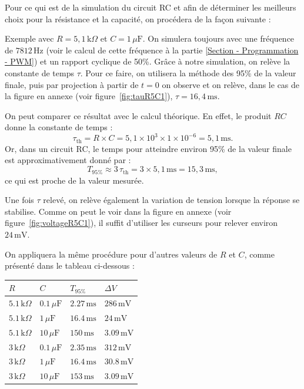 \documentclass[12pt, a4paper, titlepage]{article}
\begin{document}
Pour ce qui est de la simulation du circuit RC et afin de déterminer les meilleurs choix pour la résistance et la capacité, on procédera de la façon suivante :

Exemple avec \(R = 5,1\,\mathrm{k}\Omega\) et \(C = 1\,\mu\mathrm{F}\). On simulera toujours avec une fréquence de \(7812\,\mathrm{Hz}\) (voir le calcul de cette fréquence à la partie \ref{Section - Programmation - PWM}) et un rapport cyclique de 50\%. Grâce à notre simulation, on relève la constante de temps \(\tau\). Pour ce faire, on utilisera la méthode des 95\% de la valeur finale, puis par projection à partir de \(t = 0\) on observe et on relève, dans le cas de la figure en annexe (voir figure~\ref{fig:tauR5C1}), \(\tau = 16,4\,\mathrm{ms}\). 

On peut comparer ce résultat avec le calcul théorique. En effet, le produit \(RC\) donne la constante de temps :
\[
\tau_{\text{th}} = R \times C = 5,1 \times 10^3 \times 1 \times 10^{-6} = 5,1\,\mathrm{ms}.
\]
Or, dans un circuit RC, le temps pour atteindre environ 95\% de la valeur finale est approximativement donné par :
\[
T_{95\%} \approx 3\,\tau_{\text{th}} = 3 \times 5,1\,\mathrm{ms} = 15,3\,\mathrm{ms},
\]
ce qui est proche de la valeur mesurée.

Une fois \(\tau\) relevé, on relève également la variation de tension lorsque la réponse se stabilise. Comme on peut le voir dans la figure en annexe (voir figure~\ref{fig:voltageR5C1}), il suffit d'utiliser les curseurs pour relever environ \(24\,\mathrm{mV}\).

On appliquera la même procédure pour d'autres valeurs de \(R\) et \(C\), comme présenté dans le tableau ci-dessous :

\begin{center}
\begin{tabular}{| m{3cm} | m{3cm} | m{4cm} | m{3cm} |}
\hline
\(R\) & \(C\) & $T_{95\%}$ & \(\Delta V\) \\
\hline
\(5.1\,\mathrm{k}\Omega\) & \(0.1\,\mu\mathrm{F}\) & \(2.27\,\mathrm{ms}\)  & \(286\,\mathrm{mV}\) \\
\hline
\(5.1\,\mathrm{k}\Omega\) & \(1\,\mu\mathrm{F}\)   & \(16.4\,\mathrm{ms}\) & \(24\,\mathrm{mV}\) \\
\hline
\(5.1\,\mathrm{k}\Omega\) & \(10\,\mu\mathrm{F}\)  & \(150\,\mathrm{ms}\)  & \(3.09\,\mathrm{mV}\) \\
\hline
\(3\,\mathrm{k}\Omega\)   & \(0.1\,\mu\mathrm{F}\) & \(2.35\,\mathrm{ms}\)  & \(312\,\mathrm{mV}\) \\
\hline
\(3\,\mathrm{k}\Omega\)   & \(1\,\mu\mathrm{F}\)   & \(16.4\,\mathrm{ms}\) & \(30.8\,\mathrm{mV}\) \\
\hline
\(3\,\mathrm{k}\Omega\)   & \(10\,\mu\mathrm{F}\)  & \(153\,\mathrm{ms}\)  & \(3.09\,\mathrm{mV}\) \\
\hline
\end{tabular}
\end{center}
\end{document}
